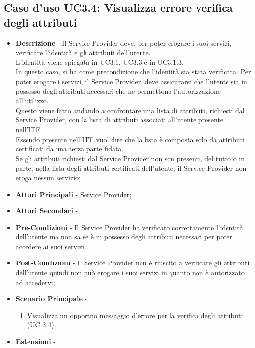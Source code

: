 \subsection{Caso d'uso UC3.4: Visualizza errore verifica degli attributi}
\begin{itemize}
	\item \textbf{Descrizione} - Il Service Provider deve, per poter erogare i suoi servizi, verificare l'identità e gli attributi dell'utente.\\
	L'identità viene spiegata in UC3.1, UC3.3 e in UC3.1.3.\\
	In questo caso, si ha come precondizione che l'identità sia stata verificata.
	Per poter erogare i servizi, il Service Provider, deve assicurarsi che l'utente sia in possesso degli attributi necessari che ne permettono l'autorizzazione all'utilizzo.\\
	Questo viene fatto andando a confrontare una lista di attributi, richiesti dal Service Provider, con la lista di attributi associati all'utente presente nell'\gls{ITF}.\\
	Essendo presente nell'\gls{ITF} vuol dire che la lista è composta solo da attributi certificati da una terza parte fidata.\\
	Se gli attributi richiesti dal Service Provider non son presenti, del tutto o in parte, nella lista degli attributi certificati dell'utente, il Service Provider non eroga nessun servizio;
	\item \textbf{Attori Principali} - Service Provider;
	\item \textbf{Attori Secondari} -
	\item \textbf{Pre-Condizioni} - Il Service Provider ha verificato correttamente l'identità dell'utente ma non sa se è in possesso degli attributi necessari per poter accedere ai suoi servizi;
	\item \textbf{Post-Condizioni} - Il Service Provider non è riuscito a verificare gli attributi dell'utente quindi non può erogare i suoi servizi in quanto non è autorizzato ad accedervi;
	\item \textbf{Scenario Principale} -
	\begin{enumerate}
		\item Visualizza un opportno messaggio d'errore per la verifica degli attributi (UC 3.4).
	\end{enumerate}
	\item \textbf{Estensioni} -
\end{itemize}
